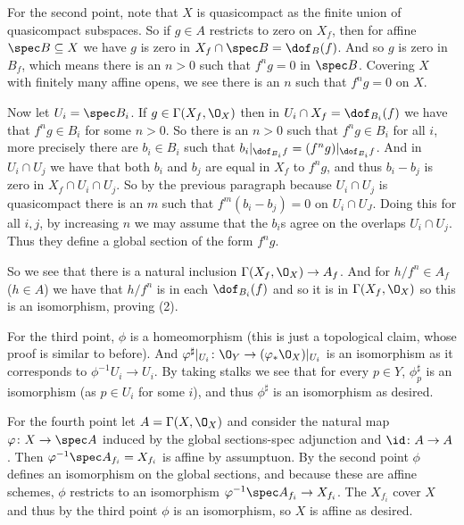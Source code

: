 For the second point, note that $X$ is quasicompact as the finite union of quasicompact subspaces.
So if $g\in A$ restricts to zero on $X_f$, then for affine $\spec B\subseteq X$ we have $g$ is zero in $X_f\cap\spec B=\dof_B(f)$.
And so $g$ is zero in $B_f$, which means there is an $n>0$ such that $f^ng=0$ in $\spec B$.
Covering $X$ with finitely many affine opens, we see there is an $n$ such that $f^ng=0$ on $X$.

Now let $U_i=\spec B_i$.
If $g\in\Gamma(X_f,\O_X)$ then in $U_i\cap X_f=\dof_{B_i}(f)$ we have that $f^ng\in B_i$ for some $n>0$.
So there is an $n>0$ such that $f^ng\in B_i$ for all $i$, more precisely there are $b_i\in B_i$ such that $b_i|_{\dof_{B_i}f}=(f^ng)|_{\dof_{B_i}f}$.
And in $U_i\cap U_j$ we have that both $b_i$ and $b_j$ are equal in $X_f$ to $f^ng$, and thus $b_i-b_j$ is zero in $X_f\cap U_i\cap U_j$.
So by the previous paragraph because $U_i\cap U_j$ is quasicompact there is an $m$ such that $f^m(b_i-b_j)=0$ on $U_i\cap U_J$.
Doing this for all $i,j$, by increasing $n$ we may assume that the $b_i$s agree on the overlaps $U_i\cap U_j$.
Thus they define a global section of the form $f^ng$.

So we see that there is a natural inclusion $\Gamma(X_f,\O_X)\to A_f$.
And for $h/f^n\in A_f$ ($h\in A$) we have that $h/f^n$ is in each $\dof_{B_i}(f)$ and so it is in $\Gamma(X_f,\O_X)$ so this is an isomorphism, proving (2).

For the third point, $\phi$ is a homeomorphism (this is just a topological claim, whose proof is similar to before).
And $\phi^\sharp|_{U_i}\colon\O_Y\to(\phi_*\O_X)|_{U_i}$ is an isomorphism as it corresponds to $\phi^{-1}U_i\to U_i$.
By taking stalks we see that for every $p\in Y$, $\phi^\sharp_p$ is an isomorphism (as $p\in U_i$ for some $i$), and thus $\phi^\sharp$ is an isomorphism
as desired.

For the fourth point let $A=\Gamma(X,\O_X)$ and consider the natural map $\phi\colon X\to\spec A$ induced by the global sections-spec adjunction and $\id\colon A\to A$.
Then $\phi^{-1}\spec A_{f_i}=X_{f_i}$ is affine by assumptuon.
By the second point $\phi$ defines an isomorphism on the global sections, and because these are affine schemes, $\phi$ restricts to an isomorphism $\phi^{-1}\spec A_{f_i}\to X_{f_i}$.
The $X_{f_i}$ cover $X$ and thus by the third point $\phi$ is an isomorphism, so $X$ is affine as desired.

\bye

